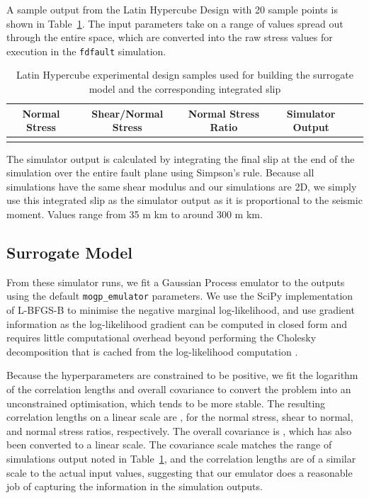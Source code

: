 \documentclass[openacc]{rstransa}%
\begin{document}
A sample output from the Latin Hypercube Design with 20 sample points is shown in Table~\ref{table_lhc}.
The input parameters take on a range of values spread out through the entire space, which are converted
into the raw stress values for execution in the \texttt{fdfault} simulation.

\begin{table}[!h]
\caption{Latin Hypercube experimental design samples used for building the surrogate model and the
corresponding integrated slip}
\label{table_lhc}
\begin{tabular}{ccccc}%
\hline
Normal Stress & Shear/Normal Stress & Normal Stress Ratio & Simulator Output \\
\hline

\\\hline
\end{tabular}
\vspace*{-4pt}
\end{table}%

The simulator output is calculated by integrating the final slip at the end of the simulation over the
entire fault plane using Simpson's rule. Because all simulations have the same shear modulus and our
simulations are 2D, we simply use this integrated slip as the simulator output as it is proportional
to the seismic moment. Values range from 35 m km to around 300 m km.

\subsection{Surrogate Model}

From these simulator runs, we fit a Gaussian Process emulator to the outputs using the default
\texttt{mogp\_emulator} parameters. We use the SciPy implementation of L-BFGS-B \cite{lbfgs,2020SciPy-NMeth} to minimise the
negative marginal log-likelihood, and use gradient information as the log-likelihood gradient
can be computed in closed form and requires little computational overhead beyond performing the
Cholesky decomposition that is cached from the log-likelihood computation \cite{gprw}.

Because the hyperparameters are constrained to be positive, we fit the logarithm of the correlation
lengths and overall covariance to convert the problem into an unconstrained optimisation, which tends
to be more stable. The resulting correlation lengths on a linear scale are \unskip,
for the normal stress, shear to normal, and normal stress ratios, respectively.
The overall covariance is \unskip, which has also been converted to a linear scale.
The covariance scale matches the range of simulations
output noted in Table~\ref{table_lhc}, and the correlation lengths are of a similar scale to the actual
input values, suggesting that our emulator does a reasonable job of capturing the information in
the simulation outputs.
\end{document}
